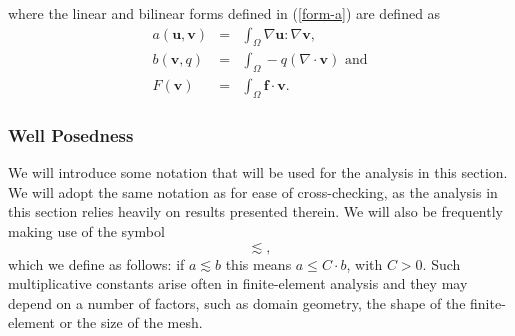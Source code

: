 \documentclass[12pt,a4paper]{article}
\theoremstyle{definition}
\begin{document}
where the linear and bilinear forms defined in (\ref{form-a}) are defined as 
\begin{eqnarray}\label{weak-a}
	a\left(\textbf{u},\textbf{v}\right)&=&\int_{\Omega}\nabla \textbf{u} : \nabla \textbf{v}, \\\label{weak-b}
	b\left(\textbf{v},q\right) &=& \int_{\Omega}-q\left(\nabla \cdot \textbf{v}\right) \text{ and}\\\label{weak-F}
    F\left(\textbf{v}\right) &=& \int_{\Omega}\textbf{f}\cdot \textbf{v} .
\end{eqnarray}

\subsubsection{Well Posedness}\label{sec_wellposed}
We will introduce some notation that will be used for the analysis in this section.  We will adopt the same notation as \cite{Chen2016} for ease of cross-checking, as the analysis in this section relies heavily on results presented therein. 
We will also be frequently making use of the symbol
\begin{equation}
	\lesssim \nonumber,
\end{equation}
which we define as follows: if $a\lesssim b$ this means $a\leq C\cdot b$, with $C>0$.  Such multiplicative constants arise often in finite-element analysis and they may depend on a number of factors, such as domain geometry, the shape of the finite-element or the size of the mesh.  
\end{document}
